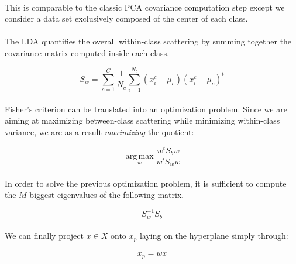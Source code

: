 \paragraph{}
This is comparable to the classic PCA covariance computation step except we consider a data set
exclusively composed of the center of each class.

\paragraph{}
The LDA quantifies the overall within-class scattering by summing together the covariance matrix
computed inside each class.

\begin{equation*}
S_w = \sum_{c = 1}^{C}\frac{1}{N_c}\sum_{i = 1}^{N_c} (x^c_i - \mu_c)(x^c_i - \mu_c)^t
\end{equation*}

\paragraph{}
Fisher's criterion can be translated into an optimization problem. Since we are aiming at maximizing
between-class scattering while minimizing within-class variance, we are as a result
\emph{maximizing} the quotient:

\begin{equation*}
\boxed{\operatorname*{arg\,max}_w \frac{w^tS_bw}{w^tS_ww}}
\end{equation*}

\paragraph{}
In order to solve the previous optimization problem, it is sufficient to compute the $M$ biggest
eigenvalues of the following matrix.

\begin{equation*}
S_w^{-1}S_b
\end{equation*}

\paragraph{}
We can finally project $x \in X$ onto $x_p$ laying on the hyperplane simply through:

\begin{equation*}
x_p = \bar{w}x
\end{equation*}
